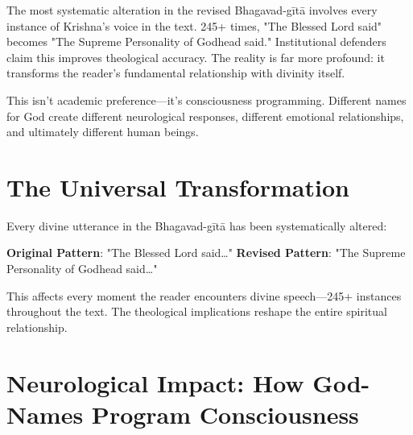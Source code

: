 \documentclass[11pt,twoside]{book}
\begin{document}
\normalfont\justifying
The most systematic alteration in the revised Bhagavad-gītā involves every instance of Krishna's voice in the text. 245+ times, "The Blessed Lord said" becomes "The Supreme Personality of Godhead said." Institutional defenders claim this improves theological accuracy. The reality is far more profound: it transforms the reader's fundamental relationship with divinity itself.

This isn't academic preference—it's consciousness programming. Different names for God create different neurological responses, different emotional relationships, and ultimately different human beings.
\section*{The Universal Transformation}
\label{sec:org5fe48a9}

Every divine utterance in the Bhagavad-gītā has been systematically altered:

\textbf{\textbf{Original Pattern}}: "The Blessed Lord said\ldots{}" 
\textbf{\textbf{Revised Pattern}}: "The Supreme Personality of Godhead said\ldots{}"

This affects every moment the reader encounters divine speech—245+ instances throughout the text. The theological implications reshape the entire spiritual relationship.
\section*{Neurological Impact: How God-Names Program Consciousness}
\label{sec:orgec9bab5}
\end{document}
